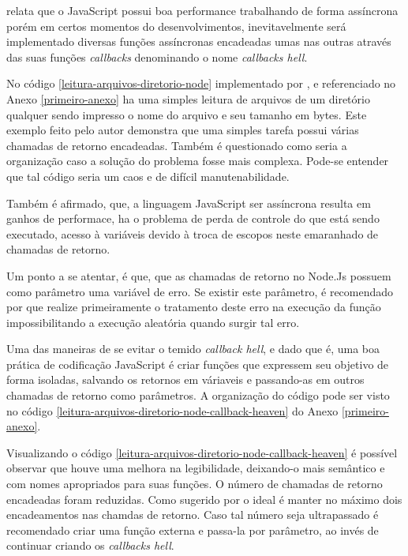 
  \cite{Pereira:2013} relata que o JavaScript possui boa performance trabalhando de forma assíncrona porém em certos 
  momentos do desenvolvimentos, inevitavelmente será implementado diversas funções assíncronas encadeadas umas nas 
  outras através das suas funções \textit{callbacks} denominando o nome \textit{callbacks hell}.
  
  No código \ref{leitura-arquivos-diretorio-node} implementado por , e referenciado no Anexo \ref{primeiro-anexo}
  ha uma simples leitura de arquivos de um diretório qualquer sendo impresso o nome do arquivo e seu tamanho em
  bytes. Este exemplo feito pelo autor demonstra que uma simples tarefa possui várias chamadas de retorno encadeadas. Também
  é questionado como seria a organização caso a solução do problema fosse mais complexa. Pode-se entender que tal código
  seria um caos e de difícil manutenabilidade.
  
  Também é afirmado, que, a linguagem JavaScript ser assíncrona resulta em ganhos de 
  performace, ha o problema de perda de controle do que está sendo executado, acesso à variáveis devido à troca de escopos
  neste emaranhado de chamadas de retorno.
  
  Um ponto a se atentar, é que, que as chamadas de retorno no Node.Js possuem como parâmetro uma variável de erro. Se existir
  este parâmetro, é recomendado por  que realize primeiramente o tratamento deste erro na execução da função
  impossibilitando a execução aleatória quando surgir tal erro.
  
  Uma das maneiras de se evitar o temido \textit{callback hell}, e dado que é, uma boa prática de codificação JavaScript é
  criar funções que expressem seu objetivo de forma isoladas, salvando os retornos em váriaveis e passando-as em outros
  chamadas de retorno como parâmetros. A organização do código pode ser visto no código \ref{leitura-arquivos-diretorio-node-callback-heaven} do
  Anexo \ref{primeiro-anexo}.\cite{Pereira:2013}
  
  Visualizando o código \ref{leitura-arquivos-diretorio-node-callback-heaven} é possível observar que houve uma melhora na 
  legibilidade, deixando-o mais semântico e com nomes apropriados para suas funções. O número de chamadas de retorno encadeadas
  foram reduzidas. Como sugerido por \cite{Pereira:2013} o ideal é manter no máximo dois encadeamentos nas chamdas de retorno.
  Caso tal número seja ultrapassado é recomendado criar uma função externa e passa-la por parâmetro, ao invés de 
  continuar criando os \textit{callbacks hell}.
  
